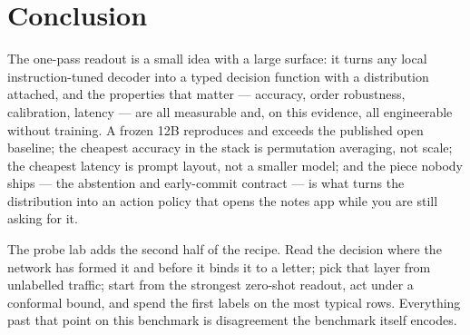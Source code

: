 \documentclass[11pt,a4paper]{article}
\begin{document}
\section{Conclusion}
The one-pass readout is a small idea with a large surface: it turns any local instruction-tuned decoder into a typed decision function with a distribution attached, and the properties that matter --- accuracy, order robustness, calibration, latency --- are all measurable and, on this evidence, all engineerable without training. A frozen 12B reproduces and exceeds the published open baseline; the cheapest accuracy in the stack is permutation averaging, not scale; the cheapest latency is prompt layout, not a smaller model; and the piece nobody ships --- the abstention and early-commit contract --- is what turns the distribution into an action policy that opens the notes app while you are still asking for it.

The probe lab adds the second half of the recipe. Read the decision where the network has formed it and before it binds it to a letter; pick that layer from unlabelled traffic; start from the strongest zero-shot readout, act under a conformal bound, and spend the first labels on the most typical rows. Everything past that point on this benchmark is disagreement the benchmark itself encodes.
\end{document}
